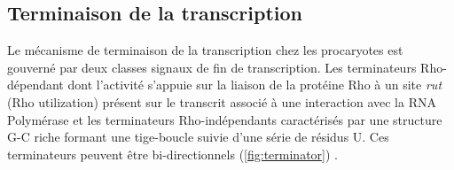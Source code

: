 \documentclass[12pt,a4paper]{report}
\begin{document}
\begin{onehalfspace}
\subsection*{Terminaison de la transcription}
Le mécanisme de terminaison de la transcription chez les procaryotes est gouverné par deux classes signaux de fin de transcription. Les terminateurs Rho-dépendant dont l'activité s'appuie sur la liaison de la protéine Rho à un site \emph{rut} (Rho utilization) présent sur le transcrit associé à une interaction avec la RNA Polymérase et les terminateurs Rho-indépendants caractérisés par une structure G-C riche formant une tige-boucle suivie d'une série de résidus U. Ces terminateurs peuvent être bi-directionnels (\autoref{fig:terminator}) \citep{Henkin2000,Lesnik2001}.  

\begin{figure}
\end{figure}


\end{onehalfspace}
\end{document}
